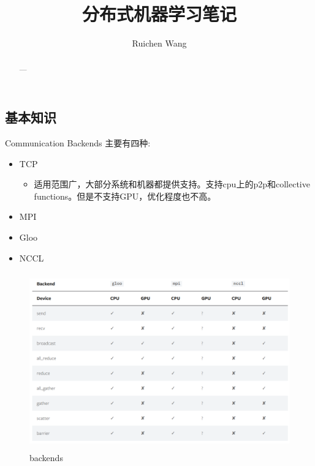 \documentclass{article}
\title{分布式机器学习笔记}
\author{Ruichen Wang}
\begin{document}
\begin{CJK*}{UTF8}{gbsn}
\maketitle
\begin{abstract}
---
\end{abstract}

\tableofcontents
\section{基本知识}
Communication Backends 主要有四种:
\begin{itemize}
\item TCP 
\begin{itemize}
\item 适用范围广，大部分系统和机器都提供支持。支持cpu上的p2p和collective functions。但是不支持GPU，优化程度也不高。
\end{itemize}
\item MPI
\item Gloo
\item NCCL
\end{itemize}

\begin{figure}[H]
\centering
\includegraphics[width=5in,height=3in]{backends}
\caption{backends}
\end{figure}




\end{CJK*}
\end{document}
